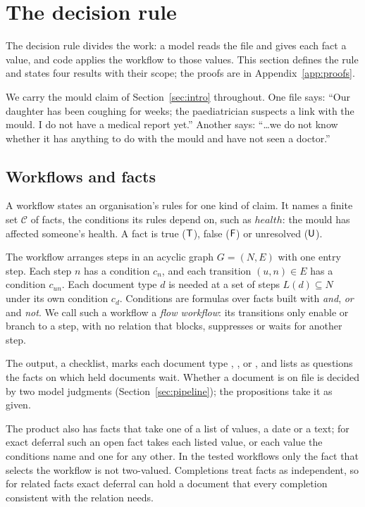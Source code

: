\section{The decision rule}
\label{sec:rule}
\label{sec:method}

The decision rule divides the work: a model reads the file and gives each fact a value, and code applies the workflow to those values. This section defines the rule and states four results with their scope; the proofs are in Appendix~\ref{app:proofs}.

We carry the mould claim of Section~\ref{sec:intro} throughout. One file says: ``Our daughter has been coughing for weeks; the paediatrician suspects a link with the mould. I do not have a medical report yet.'' Another says: ``\ldots we do not know whether it has anything to do with the mould and have not seen a doctor.''

\subsection{Workflows and facts}
\label{sec:workflow}

A workflow states an organisation's rules for one kind of claim. It names a finite set $\mathcal{C}$ of facts, the conditions its rules depend on, such as $\mathit{health}$: the mould has affected someone's health. A fact is true ($\mathsf{T}$), false ($\mathsf{F}$) or unresolved ($\mathsf{U}$).

The workflow arranges steps in an acyclic graph $G=(N,E)$ with one entry step. Each step $n$ has a condition $c_n$, and each transition $(u,n)\in E$ has a condition $c_{un}$. Each document type $d$ is needed at a set of steps $L(d)\subseteq N$ under its own condition $c_d$. Conditions are formulas over facts built with \emph{and}, \emph{or} and \emph{not}. We call such a workflow a \emph{flow workflow}: its transitions only enable or branch to a step, with no relation that blocks, suppresses or waits for another step.

The output, a checklist, marks each document type \request, \hold, \skipd or \onfile, and lists as questions the facts on which held documents wait. Whether a document is on file is decided by two model judgments (Section~\ref{sec:pipeline}); the propositions take it as given.

The product also has facts that take one of a list of values, a date or a text; for exact deferral such an open fact takes each listed value, or each value the conditions name and one for any other. In the tested workflows only the fact that selects the workflow is not two-valued. Completions treat facts as independent, so for related facts exact deferral can hold a document that every completion consistent with the relation needs.

